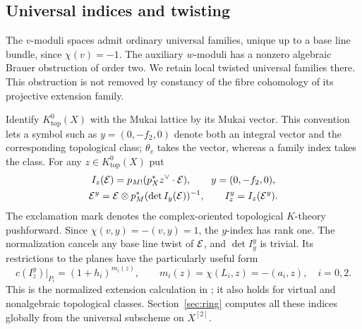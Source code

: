 \subsection{Universal indices and twisting}
The $v$-moduli spaces admit ordinary universal families, unique up
to a base line bundle, since $\chi(v)=-1$. The auxiliary $w$-moduli
has a nonzero algebraic Brauer obstruction of order two. We retain
local twisted universal families there. This obstruction is not
removed by constancy of the fibre cohomology of its projective
extension family.

Identify $K^0_{\mathrm{top}}(X)$ with the Mukai lattice by its Mukai
vector. This convention lets a symbol such as $y=(0,-f_2,0)$ denote
both an integral vector and the corresponding topological class;
$\theta_v$ takes the vector, whereas a family index takes the class.
For any $z\in K^0_{\mathrm{top}}(X)$ put
\begin{equation}\label{eq:normalized-index}
 \begin{gathered}
 I_z(\mathcal E)=p_{M!}(p_X^*z^\vee\cdot\mathcal E),\qquad y=(0,-f_2,0),\\
 \mathcal E^y=\mathcal E\otimes p_M^*(\det I_y(\mathcal E))^{-1},\qquad
 I_z^y=I_z(\mathcal E^y).
 \end{gathered}
\end{equation}
The exclamation mark denotes the complex-oriented topological
$K$-theory pushforward. Since $\chi(v,y)=-(v,y)=1$, the $y$-index
has rank one. The normalization cancels any base line twist of
$\mathcal E$, and $\det I_y^y$ is trivial. Its restrictions to the planes
have the particularly useful form
\begin{equation}\label{eq:index-plane}
 c(I_z^y)|_{P_i}=(1+h_i)^{m_i(z)},\qquad
 m_i(z)=\chi(L_i,z)=-(a_i,z),\quad i=0,2.
\end{equation}
This is the normalized extension calculation in
\cite[\S6.4]{wuebben17}; it also holds for virtual and nonalgebraic
topological classes. Section~\ref{sec:ring} computes all these
indices globally from the universal subscheme on $X^{[2]}$.
